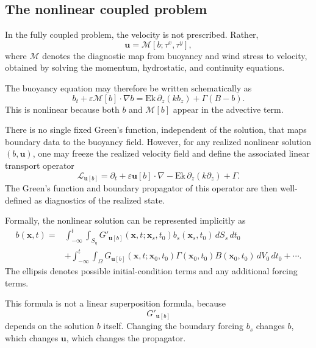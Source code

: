 \documentclass[10pt]{amsart}
\begin{document}
\subsection{The nonlinear coupled problem}

In the fully coupled problem, the velocity is not prescribed. Rather,
\begin{equation}
\mathbf u=\mathcal M[b;\tau^x,\tau^y],
\end{equation}
where \(\mathcal M\) denotes the diagnostic map from buoyancy and wind stress to velocity, obtained by solving the momentum, hydrostatic, and continuity equations.

The buoyancy equation may therefore be written schematically as
\begin{equation}
b_t+\varepsilon \mathcal M[b]\cdot\nabla b
=
\mathrm{Ek}\,\partial_z(k b_z)+\Gamma(B-b).
\end{equation}
This is nonlinear because both \(b\) and \(\mathcal M[b]\) appear in the advective term.

There is no single fixed Green's function, independent of the solution, that maps boundary data to the buoyancy field. However, for any realized nonlinear solution \((b,\mathbf u)\), one may freeze the realized velocity field and define the associated linear transport operator
\begin{equation}
\mathcal L_{\mathbf u[b]}
=
\partial_t
+
\varepsilon \mathbf u[b]\cdot\nabla
-\mathrm{Ek}\,\partial_z(k\partial_z)
+\Gamma.
\end{equation}
The Green's function and boundary propagator of this operator are then well-defined as diagnostics of the realized state.

Formally, the nonlinear solution can be represented implicitly as
\begin{align}
b(\mathbf x,t)
={}&
\int_{-\infty}^{t}\int_{S_\eta}
G'_{\mathbf u[b]}(\mathbf x,t;\mathbf x_s,t_0)
b_s(\mathbf x_s,t_0)
\,dS_s\,dt_0
\nonumber \\
&+
\int_{-\infty}^{t}\int_{\Omega}
G_{\mathbf u[b]}(\mathbf x,t;\mathbf x_0,t_0)
\Gamma(\mathbf x_0,t_0)B(\mathbf x_0,t_0)
\,dV_0\,dt_0
+\cdots.
\end{align}
The ellipsis denotes possible initial-condition terms and any additional forcing terms.

This formula is not a linear superposition formula, because
\begin{equation}
G'_{\mathbf u[b]}
\end{equation}
depends on the solution \(b\) itself. Changing the boundary forcing \(b_s\) changes \(b\), which changes \(\mathbf u\), which changes the propagator.
\end{document}
